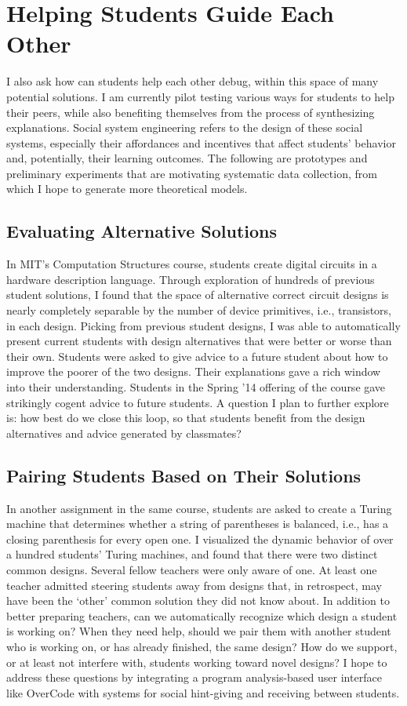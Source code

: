 \documentclass{sigchi}
\begin{document}
\section{Helping Students Guide Each Other}
I also ask how can students help each other debug, within this space of many potential solutions. I am currently pilot testing various ways for students to help their peers, while also benefiting themselves from the process of synthesizing explanations. Social system engineering refers to the design of these social systems, especially their affordances and incentives that affect students' behavior and, potentially, their learning outcomes. The following are prototypes and preliminary experiments that are motivating systematic data collection, from which I hope to generate more theoretical models.

\subsection{Evaluating Alternative Solutions} In MIT's Computation Structures course, students create digital circuits in a hardware description language. Through exploration of hundreds of previous student solutions, I found that the space of alternative correct circuit designs is nearly completely separable by the number of device primitives, i.e., transistors, in each design. Picking from previous student designs, I was able to automatically present current students with design alternatives that were better or worse than their own. Students were asked to give advice to a future student about how to improve the poorer of the two designs. Their explanations gave a rich window into their understanding. Students in the Spring '14 offering of the course gave strikingly cogent advice to future students. A question I plan to further explore is: how best do we close this loop, so that students benefit from the design alternatives and advice generated by classmates?

\subsection{Pairing Students Based on Their Solutions} In another assignment in the same course, students are asked to create a Turing machine that determines whether a string of parentheses is balanced, i.e., has a closing parenthesis for every open one. I visualized the dynamic behavior of over a hundred students' Turing machines, and found that there were two distinct common designs. Several fellow teachers were only aware of one. At least one teacher admitted steering students away from designs that, in retrospect, may have been the `other' common solution they did not know about. In addition to better preparing teachers, can we automatically recognize which design a student is working on? When they need help, should we pair them with another student who is working on, or has already finished, the same design? How do we support, or at least not interfere with, students working toward novel designs? I hope to address these questions by integrating a program analysis-based user interface like OverCode with systems for social hint-giving and receiving between students.
\end{document}
